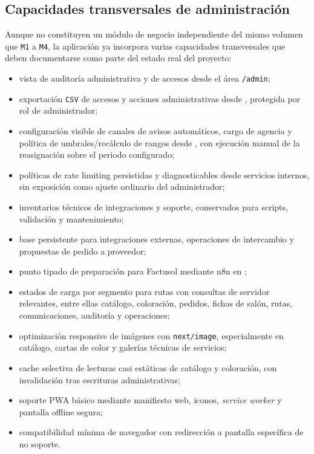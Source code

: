 \subsection{Capacidades transversales de administración}

Aunque no constituyen un módulo de negocio independiente del mismo volumen que \texttt{M1} a \texttt{M4}, la aplicación ya incorpora varias capacidades transversales que deben documentarse como parte del estado real del proyecto:

\begin{itemize}
    \item vista de auditoría administrativa y de accesos desde el área \texttt{/admin};
    \item exportación \texttt{CSV} de accesos y acciones administrativas desde , protegida por rol de administrador;
    \item configuración visible de canales de avisos automáticos, cargo de agencia y política de umbrales/recálculo de rangos desde , con ejecución manual de la reasignación sobre el periodo configurado;
    \item políticas de rate limiting persistidas y diagnosticables desde servicios internos, sin exposición como ajuste ordinario del administrador;
    \item inventarios técnicos de integraciones y soporte, conservados para scripts, validación y mantenimiento;
    \item base persistente para integraciones externas, operaciones de intercambio y propuestas de pedido a proveedor;
    \item punto tipado de preparación para Factusol mediante n8n en ;
    \item estados de carga por segmento para rutas con consultas de servidor relevantes, entre ellas catálogo, coloración, pedidos, fichas de salón, rutas, comunicaciones, auditoría y operaciones;
    \item optimización responsive de imágenes con \texttt{next/image}, especialmente en catálogo, cartas de color y galerías técnicas de servicios;
    \item cache selectiva de lecturas casi estáticas de catálogo y coloración, con invalidación tras escrituras administrativas;
    \item soporte PWA básico mediante manifiesto web, iconos, \textit{service worker} y pantalla offline segura;
    \item compatibilidad mínima de navegador con redirección a pantalla específica de no soporte.
\end{itemize}

